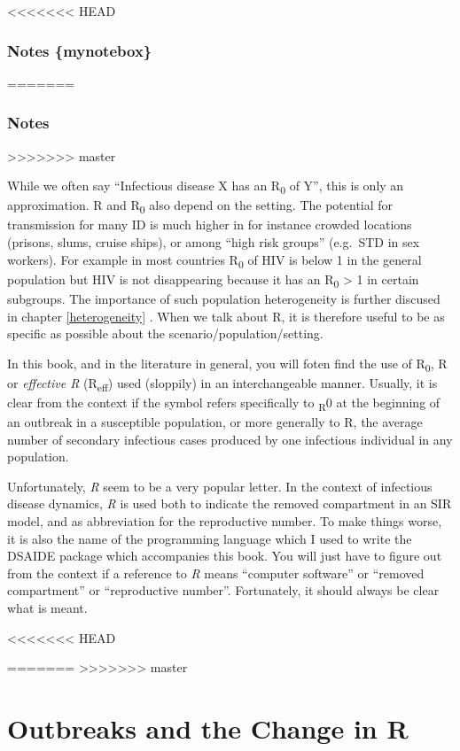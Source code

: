 \documentclass[]{book}
\theoremstyle{definition}
\theoremstyle{definition}
\theoremstyle{definition}
\theoremstyle{remark}
\begin{document}
<<<<<<< HEAD
\hypertarget{notes-mynotebox}{%
\subsubsection{Notes \{mynotebox\}}\label{notes-mynotebox}}
=======
\subsubsection{Notes}\label{mynotebox}
>>>>>>> master

While we often say ``Infectious disease X has an R\textsubscript{0} of
Y'', this is only an approximation. R and R\textsubscript{0} also depend
on the setting. The potential for transmission for many ID is much
higher in for instance crowded locations (prisons, slums, cruise ships),
or among ``high risk groups'' (e.g.~STD in sex workers). For example in
most countries R\textsubscript{0} of HIV is below 1 in the general
population but HIV is not disappearing because it has an
R\textsubscript{0} \textgreater{} 1 in certain subgroups. The importance
of such population heterogeneity is further discused in chapter
\ref{heterogeneity} . When we talk about R, it is therefore useful to be
as specific as possible about the scenario/population/setting.

In this book, and in the literature in general, you will foten find the
use of R\textsubscript{0}, R or \emph{effective R}
(R\textsubscript{eff}) used (sloppily) in an interchangeable manner.
Usually, it is clear from the context if the symbol refers specifically
to \textsubscript{R}0 at the beginning of an outbreak in a susceptible
population, or more generally to R, the average number of secondary
infectious cases produced by one infectious individual in any
population.

Unfortunately, \emph{R} seem to be a very popular letter. In the context
of infectious disease dynamics, \emph{R} is used both to indicate the
removed compartment in an SIR model, and as abbreviation for the
reproductive number. To make things worse, it is also the name of the
programming language which I used to write the DSAIDE package which
accompanies this book. You will just have to figure out from the context
if a reference to \emph{R} means ``computer software'' or ``removed
compartment'' or ``reproductive number''. Fortunately, it should always
be clear what is meant.

<<<<<<< HEAD
\hypertarget{outbreaks-and-the-change-in-r}{%
=======
>>>>>>> master
\section{Outbreaks and the Change in
R}\label{outbreaks-and-the-change-in-r}}
\end{document}
